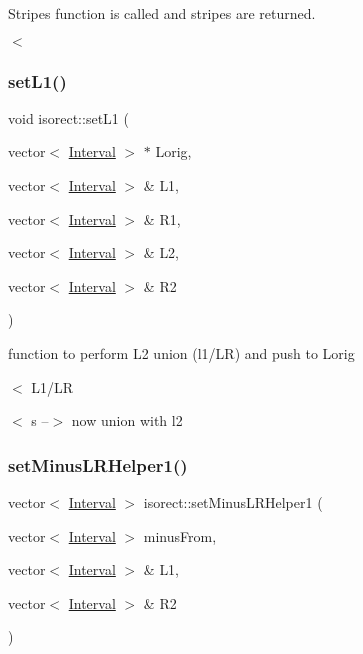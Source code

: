 Stripes function is called and stripes are returned. 

$<$ \mbox{\label{classisorect_a0c292396ca5de5692da4130819e1edba}} 
\subsubsection{\texorpdfstring{set\+L1()}{setL1()}}
{\footnotesize\ttfamily void isorect\+::set\+L1 (\begin{DoxyParamCaption}\item[{vector$<$ \hyperlink{classInterval}{Interval} $>$ $\ast$}]{Lorig,  }\item[{vector$<$ \hyperlink{classInterval}{Interval} $>$ \&}]{L1,  }\item[{vector$<$ \hyperlink{classInterval}{Interval} $>$ \&}]{R1,  }\item[{vector$<$ \hyperlink{classInterval}{Interval} $>$ \&}]{L2,  }\item[{vector$<$ \hyperlink{classInterval}{Interval} $>$ \&}]{R2 }\end{DoxyParamCaption})}



function to perform L2 union (l1/\+LR) and push to Lorig 

$<$ L1/\+LR

$<$ s --$>$ now union with l2 \mbox{\label{classisorect_ac0bb316a2ec6e0003ae4f298e789c3f9}} 
\subsubsection{\texorpdfstring{set\+Minus\+L\+R\+Helper1()}{setMinusLRHelper1()}}
{\footnotesize\ttfamily vector$<$ \hyperlink{classInterval}{Interval} $>$ isorect\+::set\+Minus\+L\+R\+Helper1 (\begin{DoxyParamCaption}\item[{vector$<$ \hyperlink{classInterval}{Interval} $>$}]{minus\+From,  }\item[{vector$<$ \hyperlink{classInterval}{Interval} $>$ \&}]{L1,  }\item[{vector$<$ \hyperlink{classInterval}{Interval} $>$ \&}]{R2 }\end{DoxyParamCaption})}



